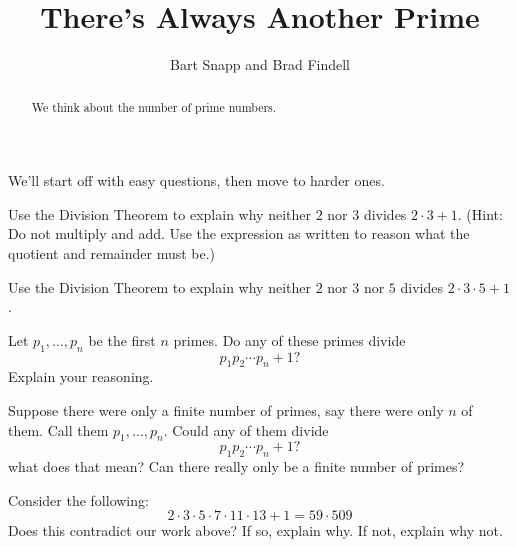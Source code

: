 \documentclass[nooutcomes]{ximera}
\title{There's Always Another Prime}
\author{Bart Snapp and Brad Findell}
\begin{document}
\begin{abstract}
  We think about the number of prime numbers.
\end{abstract}
\maketitle

\label{A:Pr}

We'll start off with easy questions, then move to harder ones.  

\begin{problem}
Use the Division Theorem to explain why neither $2$ nor $3$ divides
$2\cdot 3+1$.  (Hint:  Do not multiply and add.  Use the expression 
as written to reason what the quotient and remainder must be.)
\end{problem}

\begin{problem}
Use the Division Theorem to explain why neither $2$ nor $3$ nor $5$ divides
$2\cdot 3\cdot 5+1$.
\end{problem}

\begin{problem} 
Let $p_1,\dots, p_n$ be the first $n$ primes. Do any of these primes divide 
\[
p_1p_2\cdots p_n + 1?
\]
Explain your reasoning.
\end{problem}


\begin{problem} 
Suppose there were only a finite number of primes, say there were only
$n$ of them. Call them $p_1,\dots, p_n$. Could any of them divide
\[
p_1p_2\cdots p_n + 1?
\]
what does that mean? Can there really only be a finite number of
primes?
\end{problem}


\begin{problem} 
Consider the following:
\[
2\cdot 3\cdot 5\cdot 7 \cdot 11\cdot 13 + 1 = 59\cdot 509
\] 
Does this contradict our work above? If so, explain why. If not, explain
why not.
\end{problem}
\end{document}
